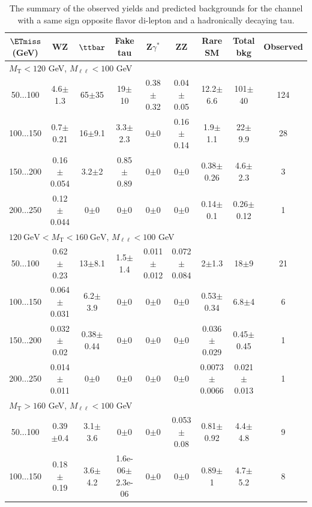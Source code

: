 \begin{landscape}
\begin{table}
\end{table}
\begin{table}
\small
\begin{center}
\caption{\label{tab:OSOFtau1} The summary of the observed yields and predicted backgrounds for the channel 
with a same sign opposite flavor di-lepton and a hadronically decaying tau. }
\begin{tabular}{| c | c c c c c c  | c  c | }\hline\hline
$\ETmiss$ (GeV) & WZ & $\ttbar$ & Fake tau & Z$\gamma^*$ & ZZ & Rare SM & Total bkg & Observed\\\hline\hline
\multicolumn{8}{l}{$M_{\text{T}} < 120$ GeV, $M_{\ell\ell} < 100$ GeV}\\\hline\hline
50$\dots$100&4.6$\pm$1.3&65$\pm$35&19$\pm$10&0.38$\pm$0.32&0.04$\pm$0.05&12.2$\pm$6.6&101$\pm$40&124\\
100$\dots$150&0.7$\pm$0.21&16$\pm$9.1&3.3$\pm$2.3&0$\pm$0&0.16$\pm$0.14&1.9$\pm$1.1&22$\pm$9.9&28\\
150$\dots$200&0.16$\pm$0.054&3.2$\pm$2&0.85$\pm$0.89&0$\pm$0&0$\pm$0&0.38$\pm$0.26&4.6$\pm$2.3&3\\
200$\dots$250&0.12$\pm$0.044&0$\pm$0&0$\pm$0&0$\pm$0&0$\pm$0&0.14$\pm$0.1&0.26$\pm$0.12&1\\
\hline\hline
\multicolumn{8}{l}{$120~\mathrm{GeV} < M_{\text{T}} < 160~\mathrm{GeV}$, $M_{\ell\ell} < 100$ GeV}\\\hline\hline
50$\dots$100&0.62$\pm$0.23&13$\pm$8.1&1.5$\pm$1.4&0.011$\pm$0.012&0.072$\pm$0.084&2$\pm$1.3&18$\pm$9&21\\
100$\dots$150&0.064$\pm$0.031&6.2$\pm$3.9&0$\pm$0&0$\pm$0&0$\pm$0&0.53$\pm$0.34&6.8$\pm$4&6\\
150$\dots$200&0.032$\pm$0.02&0.38$\pm$0.44&0$\pm$0&0$\pm$0&0$\pm$0&0.036$\pm$0.029&0.45$\pm$0.45&1\\
200$\dots$250&0.014$\pm$0.011&0$\pm$0&0$\pm$0&0$\pm$0&0$\pm$0&0.0073$\pm$0.0066&0.021$\pm$0.013&1\\
\hline\hline
\multicolumn{8}{l}{$M_{\text{T}} > 160$ GeV, $M_{\ell\ell} < 100$ GeV}\\\hline\hline
50$\dots$100&0.39$\pm$0.4&3.1$\pm$3.6&0$\pm$0&0$\pm$0&0.053$\pm$0.08&0.81$\pm$0.92&4.4$\pm$4.8&9\\
100$\dots$150&0.18$\pm$0.19&3.6$\pm$4.2&1.6e-06$\pm$2.3e-06&0$\pm$0&0$\pm$0&0.89$\pm$1&4.7$\pm$5.2&8\\

\end{tabular}
\end{center}
\end{table}
\end{landscape}
